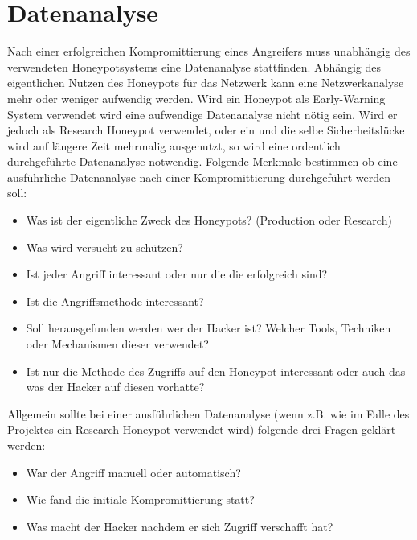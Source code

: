 \section{Datenanalyse}
Nach einer erfolgreichen Kompromittierung eines Angreifers muss unabhängig des verwendeten Honeypotsystems eine Datenanalyse stattfinden. Abhängig des eigentlichen Nutzen des Honeypots für das Netzwerk kann eine Netzwerkanalyse mehr oder weniger aufwendig werden. Wird ein Honeypot als Early-Warning System verwendet wird eine aufwendige Datenanalyse nicht nötig sein. Wird er jedoch als Research Honeypot verwendet, oder ein und die selbe Sicherheitslücke wird auf längere Zeit mehrmalig ausgenutzt, so wird eine ordentlich durchgeführte Datenanalyse notwendig. Folgende Merkmale bestimmen ob eine ausführliche Datenanalyse nach einer Kompromittierung durchgeführt werden soll\cite{grimes.2003a}:

\begin{itemize}	
\item Was ist der eigentliche Zweck des Honeypots? (Production oder Research)
\item Was wird versucht zu schützen?
\item Ist jeder Angriff interessant oder nur die die erfolgreich sind?
\item Ist die Angriffsmethode interessant?
\item Soll herausgefunden werden wer der Hacker ist? Welcher Tools, Techniken oder Mechanismen dieser verwendet?
\item Ist nur die Methode des Zugriffs auf den Honeypot interessant oder auch das was der Hacker auf diesen vorhatte?
\end{itemize}

Allgemein sollte bei einer ausführlichen Datenanalyse (wenn z.B. wie im Falle des Projektes ein Research Honeypot verwendet wird) folgende drei Fragen geklärt werden:

\begin{itemize}
\item War der Angriff manuell oder automatisch?
\item Wie fand die initiale Kompromittierung statt?
\item Was macht der Hacker nachdem er sich Zugriff verschafft hat?
\end{itemize}

